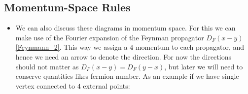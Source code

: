\documentclass[11pt]{article}
\numberwithin{equation}{section}
\begin{document}
\subsection{Momentum-Space Rules} %
\label{sub:momentum_space_rules}
\begin{itemize}
  \item We can also discuss these diagrams in momentum space. For this we can make use of the Fourier expansion of the Feynman propagator $D_F(x-y)$ \ref{Feynmann_2}. This way we assign a $4$-momentum to each propagator, and hence we need an arrow to denote the direction. For now the directions should not matter as $D_F(x-y)=D_F(y-x)$, but later we will need to conserve quantities likes fermion number. As an example if we have single vertex connected to $4$ external points:
\begin{center}
\end{center}
\end{itemize}
\end{document}
